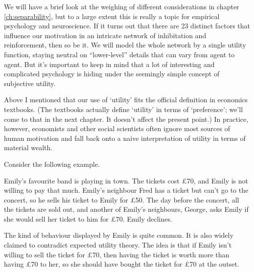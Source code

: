 We will have a brief look at the weighing of different considerations in chapter
\ref{ch:separability}, but to a large extent this is really a topic for
empirical psychology and neuroscience. If it turns out that there are 23
distinct factors that influence our motivation in an intricate network of
inhibitation and reinforcement, then so be it. We will model the whole network
by a single utility function, staying neutral on ``lower-level'' details that
can vary from agent to agent.  But it's important to keep in mind that a lot of
interesting and complicated psychology is hiding under the seemingly simple
concept of subjective utility.



Above I mentioned that our use of `utility' fits the official
definition in economics textbooks. (The textbooks actually define
`utility' in terms of `preference'; we'll come to that in the next
chapter. It doesn't affect the present point.) In practice, however,
economists and other social scientists often ignore most sources of
human motivation and fall back onto a naive interpretation of utility
in terms of material wealth.

Consider the following example.

\begin{example}
  Emily's favourite band is playing in town. The tickets cost £70, and
  Emily is not willing to pay that much. Emily's neighbour Fred has a
  ticket but can't go to the concert, so he sells his ticket to Emily
  for £50. The day before the concert, all the tickets are sold out,
  and another of Emily's neighbours, George, asks Emily if she would
  sell her ticket to him for £70. Emily declines.
\end{example}

The kind of behaviour displayed by Emily is quite common. It is also
widely claimed to contradict expected utility theory. The idea is that
if Emily isn't willing to sell the ticket for £70, then having the
ticket is worth more than having £70 to her, so she should have bought
the ticket for £70 at the outset.

